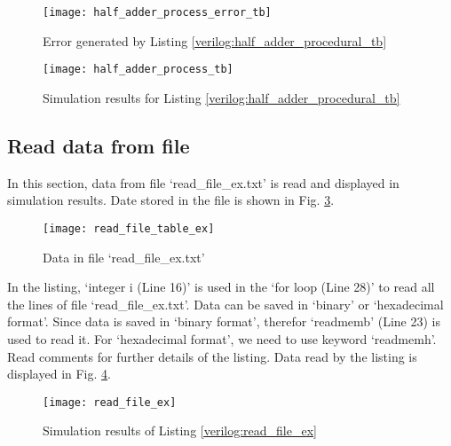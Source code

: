 
%

\begin{figure}[!h]
	\centering
	\texttt{[image: half\_adder\_process\_error\_tb]}
	\caption{Error generated by Listing \ref{verilog:half_adder_procedural_tb}}
	\label{fig:half_adder_process_error_tb}
\end{figure}

\begin{figure}[!h]
	\centering
	\texttt{[image: half\_adder\_process\_tb]}
	\caption{Simulation results for Listing \ref{verilog:half_adder_procedural_tb}}
	\label{fig:half_adder_process_tb}
\end{figure}



\subsection{Read data from file} \label{sec_read_data_from_file}
%
In this section, data from file `read\_file\_ex.txt' is read and displayed in simulation results. Date stored in the file is shown in Fig. \ref{fig:read_file_table_ex}. 

\begin{figure}[!h]
	\centering
	\texttt{[image: read\_file\_table\_ex]}
	\caption{Data in file  `read\_file\_ex.txt'}
	\label{fig:read_file_table_ex}
\end{figure}

\begin{explanation}
	In the listing, `integer i (Line 16)' is used in the `for loop (Line 28)' to read all the lines of file `read\_file\_ex.txt'. Data can be saved in `binary' or `hexadecimal format'. Since data is saved in `binary format', therefor `readmemb' (Line 23) is used to read it. For `hexadecimal format', we need to use keyword `readmemh'. Read comments for further details of the listing. Data read by the listing is displayed in Fig. \ref{fig:read_file_ex}.  
\end{explanation}



\begin{figure}[!h]
	\centering
	\texttt{[image: read\_file\_ex]}
	\caption{Simulation results of Listing \ref{verilog:read_file_ex} }
	\label{fig:read_file_ex}
\end{figure}
%
%
